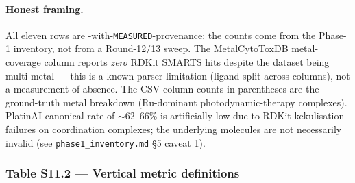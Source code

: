 \begin{table}[h]
\caption{Local dataset provenance under \texttt{/mnt/storage/data/molmetal/}
+ \texttt{/mnt/storage/models/reinvent4/} (Phase-1 audit, 2026-09-16).
Heavy-atom column is min/max/median over a 3\,000-sample random scan
(seed=0); Metal column is RDKit SMARTS hits in that sample for PlatinAI
and tmQM, and CSV-column counts for MetalCytoToxDB (RDKit miss is a
known artefact of split Counterion+Ligand columns, see
\texttt{phase1\_inventory.md} \S2.2).  NCI60 GI50 is SMILES-less and
joined only on NSC.  Citations: PlatinAI dataset
\cite{footnote:platinai_dataset} (cite-only); MetalCytoToxDB
\cite{footnote:metalcytotoxdb} (cite-only); NCI60
\cite{footnote:nci60}; tmQM \cite{footnote:tmqm}; CrossDocked2020
\cite{luo2021crossdocked}; AiZynthFinder
\cite{footnote:aizynthfinder}; REINVENT4 \cite{footnote:reinvent4}.}
\label{tab:s11-dataset-provenance}
\end{table}

\paragraph{Honest framing.}
All eleven rows are \DESIGN{}-with-\texttt{MEASURED}-provenance: the
counts come from the Phase-1 inventory, not from a Round-12/13 sweep.
The MetalCytoToxDB metal-coverage column reports \emph{zero} RDKit
SMARTS hits despite the dataset being multi-metal --- this is a known
parser limitation (ligand split across columns), not a measurement of
absence.  The CSV-column counts in parentheses are the ground-truth
metal breakdown (Ru-dominant photodynamic-therapy complexes).
PlatinAI canonical rate of $\sim$62--66\% is artificially low due to
RDKit kekulisation failures on coordination complexes; the underlying
molecules are not necessarily invalid (see
\texttt{phase1\_inventory.md} \S5 caveat 1).


\subsubsection*{Table S11.2 --- Vertical metric definitions}

